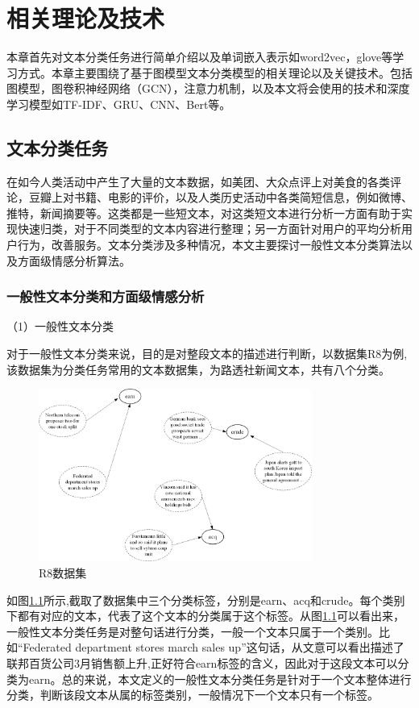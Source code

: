 \chapter{相关理论及技术}
本章首先对文本分类任务进行简单介绍以及单词嵌入表示如word2vec，glove等学习方式。本章主要围绕了基于图模型文本分类模型的相关理论以及关键技术。包括图模型，图卷积神经网络（GCN），注意力机制，以及本文将会使用的技术和深度学习模型如TF-IDF、GRU、CNN、Bert等。
\section{文本分类任务}
在如今人类活动中产生了大量的文本数据，如美团、大众点评上对美食的各类评论，豆瓣上对书籍、电影的评价，以及人类历史活动中各类简短信息，例如微博、推特，新闻摘要等。这类都是一些短文本，对这类短文本进行分析一方面有助于实现快速归类，对于不同类型的文本内容进行整理；另一方面针对用户的平均分析用户行为，改善服务。文本分类涉及多种情况，本文主要探讨一般性文本分类算法以及方面级情感分析算法。
\subsection{一般性文本分类和方面级情感分析}
（1）一般性文本分类

对于一般性文本分类来说，目的是对整段文本的描述进行判断，以数据集R8为例,该数据集为分类任务常用的文本数据集，为路透社新闻文本，共有八个分类。

\begin{figure}[htb]%
	\setlength{\belowcaptionskip}{0pt}
	\centering
	\includegraphics[width=0.8\textwidth]{pic/2-1.png}
	\caption{R8数据集}
	\label{R8datasets}
\end{figure}
如图\ref{R8datasets}所示,截取了数据集中三个分类标签，分别是earn、acq和crude。每个类别下都有对应的文本，代表了这个文本的分类属于这个标签。从图\ref{R8datasets}可以看出来，一般性文本分类任务是对整句话进行分类，一般一个文本只属于一个类别。比如“Federated department stores march sales up”这句话，从文意可以看出描述了联邦百货公司3月销售额上升,正好符合earn标签的含义，因此对于这段文本可以分类为earn。总的来说，本文定义的一般性文本分类任务是针对于一个文本整体进行分类，判断该段文本从属的标签类别，一般情况下一个文本只有一个标签。

